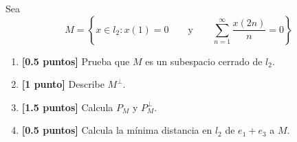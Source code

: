 \documentclass[12pt]{article}
\begin{document}
    \begin{ejercicio}[3. puntos]
        Sea
        \begin{equation*}
            M = \left\{x\in l_2 : x(1) = 0 \qquad \text{y}\qquad \sum_{n=1}^{\infty}\frac{x(2n)}{n} = 0\right\}
        \end{equation*}
        \begin{enumerate}[label=\alph*)]
            \item\textbf{[0.5 puntos]} Prueba que $M$ es un subespacio cerrado de $l_2$.
            \item\textbf{[1 punto]} Describe $M^\perp$.
            \item \textbf{[1.5 puntos]} Calcula $P_M$ y $P_M^\perp$.
            \item \textbf{[0.5 puntos]} Calcula la mínima distancia en $l_2$ de $e_1+e_3$ a $M$.
        \end{enumerate}
    \end{ejercicio}




\end{document}
